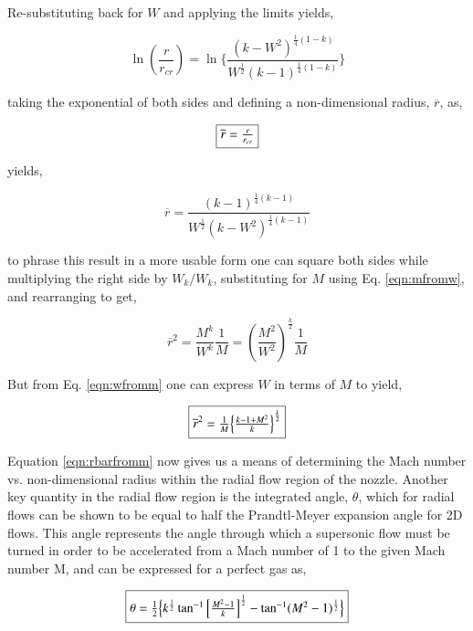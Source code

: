 	Re-substituting back for $W$ and applying the limits yields,

\begin{displaymath}
	\ln(\frac{r}{r_{cr}}) = \ln\Big\{\frac{(k-W^2)^{\frac{1}{4}(1-k)}}{W^{\frac{1}{2}}
	(k-1)^{\frac{1}{4}(1-k)}}\Big\}
\end{displaymath}

	taking the exponential of both sides and defining a non-dimensional radius, $\overline{r}$,
as,

\begin{equation}
	\fbox{$
	\overline{r} = \frac{r}{r_{cr}}
	$}
\label{eqn:rbar}
\end{equation}

	yields,

\begin{displaymath}
	\overline{r} = \frac{(k-1)^{\frac{1}{4}(k-1)}}{W^{\frac{1}{2}}(k-W^2)^{\frac{1}{4}(k-1)}}
\end{displaymath}

	to phrase this result in a more usable form one can square both sides while
multiplying the right side by $W_k/W_k$, substituting for $M$ using Eq. \ref{eqn:mfromw}, 
and rearranging to get,

\begin{displaymath}
	\overline{r}^2 = \frac{M^k}{W^k}\frac{1}{M} = (\frac{M^2}{W^2})^{\frac{k}{2}}\frac{1}{M}
\end{displaymath}
	
	But from Eq. \ref{eqn:wfromm} one can express $W$ in terms of $M$ to yield,

\begin{equation}
	\fbox{$
	\overline{r}^2 = \frac{1}{M}\Big\{\frac{k-1+M^2}{k}\Big\}^{\frac{k}{2}}
	$}
\label{eqn:rbarfromm}
\end{equation}

	Equation \ref{eqn:rbarfromm} now gives us a means of determining the Mach number
vs. non-dimensional radius within the radial flow region of the nozzle.
Another key quantity in the radial flow region is the integrated angle, $\theta$, which for
radial flows can be shown to be equal to half the Prandtl-Meyer expansion angle for 2D flows.
This angle represents the angle through which a supersonic flow must be turned in order to be
accelerated from a Mach number of 1 to the given Mach number M, and can be expressed
for a perfect gas as,

\begin{equation}
	\fbox{$
	\theta = \frac{1}{2}\Big\{k^{\frac{1}{2}}\tan^{-1}\Big[\frac{M^2-1}{k}\Big]^{\frac{1}{2}}
	- \tan^{-1}(M^2-1)^{\frac{1}{2}}\Big\}
	$}
\label{eqn:intang}
\end{equation}

